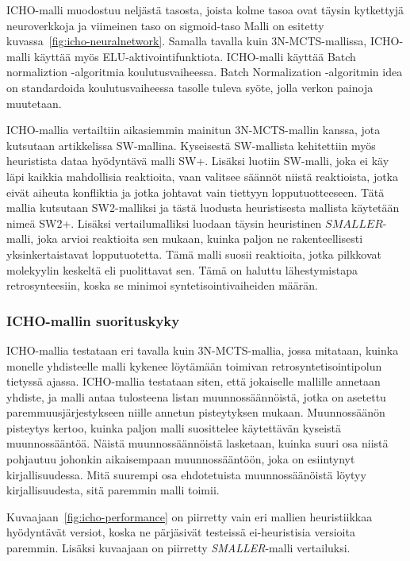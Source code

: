 \documentclass[finnish,twoside,censored,tkt,sw-line]{HYthesisML}
\begin{document}
ICHO-malli muodostuu neljästä tasosta, joista kolme tasoa ovat täysin kytkettyjä neuroverkkoja ja viimeinen taso on sigmoid-taso
Malli on esitetty kuvassa~\ref{fig:icho-neuralnetwork}.
Samalla tavalla kuin 3N-MCTS-mallissa, ICHO-malli käyttää myös ELU-aktivointifunktiota.
ICHO-malli käyttää Batch normaliztion -algoritmia koulutusvaiheessa.
Batch Normalization -algoritmin idea on standardoida koulutusvaiheessa tasolle tuleva syöte, jolla verkon painoja muutetaan.

ICHO-mallia vertailtiin aikasiemmin mainitun 3N-MCTS-mallin kanssa, jota kutsutaan artikkelissa SW-mallina.
Kyseisestä SW-mallista kehitettiin myös heuristista dataa hyödyntävä malli SW+.
Lisäksi luotiin SW-malli, joka ei käy läpi kaikkia mahdollisia reaktioita, vaan valitsee säännöt niistä reaktioista, jotka eivät aiheuta konfliktia ja jotka johtavat vain tiettyyn lopputuotteeseen.
Tätä mallia kutsutaan SW2-malliksi ja tästä luodusta heuristisesta mallista käytetään nimeä SW2+.
Lisäksi vertailumalliksi luodaan täysin heuristinen \(SMALLER\)-malli, joka arvioi reaktioita sen mukaan, kuinka paljon ne rakenteellisesti yksinkertaistavat lopputuotetta.
Tämä malli suosii reaktioita, jotka pilkkovat molekyylin keskeltä eli puolittavat sen.
Tämä on haluttu lähestymistapa retrosynteesiin, koska se minimoi syntetisointivaiheiden määrän.

\subsubsection{ICHO-mallin suorituskyky}

ICHO-mallia testataan eri tavalla kuin 3N-MCTS-mallia, jossa mitataan, kuinka monelle yhdisteelle malli kykenee löytämään toimivan retrosyntetisointipolun tietyssä ajassa.
ICHO-mallia testataan siten, että jokaiselle mallille annetaan yhdiste, ja malli antaa tulosteena listan muunnossäännöistä, jotka on asetettu paremmuusjärjestykseen niille annetun pisteytyksen mukaan.
Muunnossäänön pisteytys kertoo, kuinka paljon malli suosittelee käytettävän kyseistä muunnossääntöä.
Näistä muunnossäännöistä lasketaan, kuinka suuri osa niistä pohjautuu johonkin aikaisempaan muunnossääntöön, joka on esiintynyt kirjallisuudessa.
Mitä suurempi osa ehdotetuista muunnossäänöistä löytyy kirjallisuudesta, sitä paremmin malli toimii.

Kuvaajaan~\ref{fig:icho-performance} on piirretty vain eri mallien heuristiikkaa hyödyntävät versiot, koska ne pärjäsivät testeissä ei-heuristisia versioita paremmin.
Lisäksi kuvaajaan on piirretty \emph{SMALLER}-malli vertailuksi.
\end{document}
